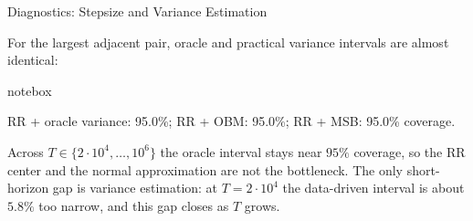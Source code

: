 \documentclass[11pt,aspectratio=169,xcolor=table]{beamer}
\newcommand{\smallgray}[1]{{\scriptsize\color{ThesisGray}#1}}
\newenvironment{notebox}
  {\begin{beamercolorbox}[wd=\linewidth,sep=0.42em,center,rounded=true]{notebox}%
   \begin{minipage}{0.96\linewidth}\centering}
  {\end{minipage}\end{beamercolorbox}}
\begin{document}
\begin{frame}{Diagnostics: Stepsize and Variance Estimation}
\footnotesize
\renewcommand{\arraystretch}{1.18}
\begin{center}
\end{center}

\vspace{0.45em}
For the largest adjacent pair, oracle and practical variance intervals are
almost identical:

\begin{notebox}
RR + oracle variance: 95.0\%; RR + OBM: 95.0\%; RR + MSB: 95.0\% coverage.
\end{notebox}

\vspace{0.35em}
\smallgray{Across $T\in\{2\cdot10^4,\ldots,10^6\}$ the oracle interval stays
near $95\%$ coverage, so the RR center and the normal approximation are not
the bottleneck. The only short-horizon gap is variance estimation: at
$T=2\cdot10^4$ the data-driven interval is about $5.8\%$ too narrow, and this
gap closes as $T$ grows.}
\end{frame}
\end{document}
